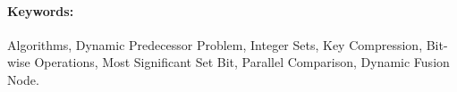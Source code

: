 \paragraph*{Keywords:} Algorithms, Dynamic Predecessor Problem, Integer Sets, Key Compression, Bit-wise Operations, Most Significant Set Bit, Parallel Comparison, Dynamic Fusion Node.

    
    
    


